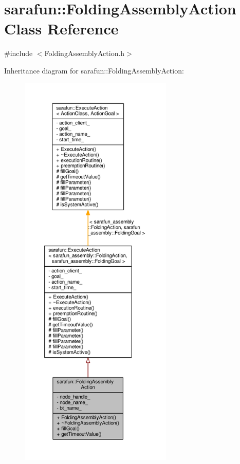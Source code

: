 \hypertarget{classsarafun_1_1FoldingAssemblyAction}{\section{sarafun\-:\-:Folding\-Assembly\-Action Class Reference}
\label{classsarafun_1_1FoldingAssemblyAction}
}


{\ttfamily \#include $<$Folding\-Assembly\-Action.\-h$>$}



Inheritance diagram for sarafun\-:\-:Folding\-Assembly\-Action\-:
\nopagebreak
\begin{figure}[H]
\begin{center}
\leavevmode
\includegraphics[height=550pt]{d3/d87/classsarafun_1_1FoldingAssemblyAction__inherit__graph}
\end{center}
\end{figure}



